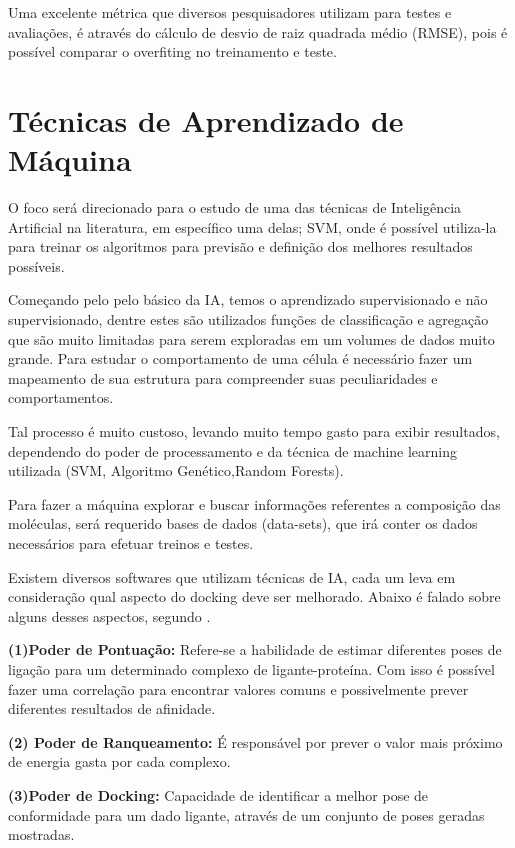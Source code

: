 \documentclass[tcc, capa]{texucpel}
\begin{document}
Uma excelente métrica que diversos pesquisadores utilizam para testes e avaliações, é através do cálculo de desvio de raiz quadrada médio (RMSE), pois é possível comparar o overfiting no treinamento e teste.

\section{Técnicas de Aprendizado de Máquina }
O foco será direcionado para o estudo de uma das técnicas de Inteligência Artificial na literatura, em específico uma delas; SVM, onde é possível utiliza-la para treinar os algoritmos para previsão e definição dos melhores resultados possíveis. 

Começando pelo pelo básico da IA, temos o aprendizado supervisionado e não supervisionado, dentre estes são utilizados funções de classificação e agregação que são muito limitadas para serem exploradas em um volumes de dados muito grande.%
Para estudar o comportamento de uma célula é necessário fazer um mapeamento de sua estrutura para compreender suas peculiaridades e comportamentos. 

Tal processo é muito custoso, levando muito tempo gasto para exibir resultados, dependendo do poder de processamento e da técnica de machine learning utilizada (SVM, Algoritmo Genético,Random Forests).

Para fazer a máquina explorar e buscar informações referentes a composição das moléculas, será requerido bases de dados (data-sets), que irá conter os dados necessários para efetuar treinos e testes. 

Existem diversos softwares que utilizam técnicas de IA, cada um leva em consideração qual aspecto do docking deve ser melhorado. Abaixo é falado sobre alguns desses aspectos, segundo \textbf{\cite{khamis2015machine}}.

\textbf{(1)Poder de Pontuação:} Refere-se a habilidade de estimar diferentes poses de ligação para um determinado complexo de ligante-proteína. Com isso é possível fazer uma correlação para encontrar valores comuns e possivelmente prever diferentes resultados de afinidade.

\textbf{(2) Poder de Ranqueamento:}
É responsável por prever o valor mais próximo de energia gasta por cada complexo.

\textbf{(3)Poder de Docking:} Capacidade de identificar a melhor pose de conformidade para um dado ligante, através de um conjunto de poses geradas mostradas.
\end{document}
